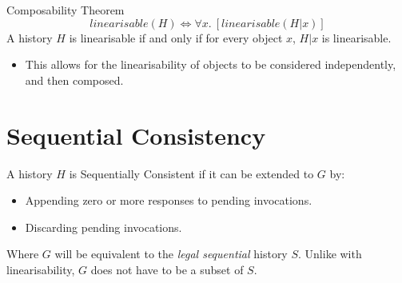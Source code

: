 \begin{definitionbox}{Composability Theorem}
    \[linearisable(H) \Leftrightarrow \forall x. \ [linearisable(H|x)]\]
    A history $H$ is linearisable if and only if for every object $x$, $H|x$ is linearisable.
    \begin{itemize}
        \item This allows for the linearisability of objects to be considered independently, and then composed.
    \end{itemize}
\end{definitionbox}

\section{Sequential Consistency}
A history $H$ is Sequentially Consistent if it can be extended to $G$ by:
\begin{itemize}
    \item Appending zero or more responses to pending invocations.
    \item Discarding pending invocations.
\end{itemize}
Where $G$ will be equivalent to the \textit{legal sequential} history $S$. Unlike with linearisability, $G$ does not have to be a subset of $S$.

\unfinished
